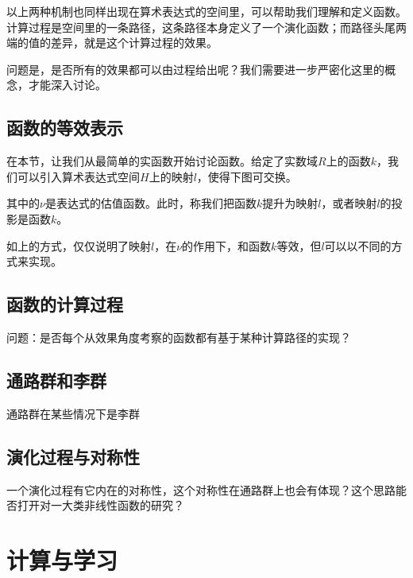 \documentclass[a4paper,12pt]{article}
\numberwithin{definition}{section}
\numberwithin{lemma}{section}
\numberwithin{proposition}{section}
\numberwithin{theorem}{section}
\numberwithin{grammar}{section}
\numberwithin{program}{section}
\numberwithin{convention}{section}
\numberwithin{corollary}{section}
\begin{document}
以上两种机制也同样出现在算术表达式的空间里，可以帮助我们理解和定义函数。
计算过程是空间里的一条路径，这条路径本身定义了一个演化函数；而路径头尾两端的值的差异，就是这个计算过程的效果。

问题是，是否所有的效果都可以由过程给出呢？我们需要进一步严密化这里的概念，才能深入讨论。

\subsection{函数的等效表示}

在本节，让我们从最简单的实函数开始讨论函数。给定了实数域$R$上的函数$k$，我们可以引入算术表达式空间$H$上的映射$l$，使得下图可交换。

\begin{center}
\end{center}

其中的$\nu$是表达式的估值函数。此时，称我们把函数$k$提升为映射$l$，或者映射$l$的投影是函数$k$。

如上的方式，仅仅说明了映射$l$，在$\nu$的作用下，和函数$k$等效，但$l$可以以不同的方式来实现。

\subsection{函数的计算过程}

问题：是否每个从效果角度考察的函数都有基于某种计算路径的实现？

\subsection{通路群和李群}

通路群在某些情况下是李群

\subsection{演化过程与对称性}

一个演化过程有它内在的对称性，这个对称性在通路群上也会有体现？这个思路能否打开对一大类非线性函数的研究？

\newpage

\section{计算与学习}
\end{document}
